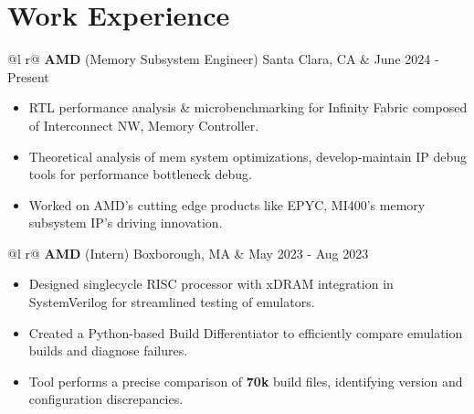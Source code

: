 \documentclass[a4paper,10pt]{article}
\begin{document}
\section{Work Experience}
\begin{tabularx}{\linewidth}{ @{}l r@{} }
    \textbf{AMD} (Memory Subsystem Engineer) Santa Clara, CA & \hfill {\small June 2024 - Present} \\[2.75pt]
    {
        \begin{minipage}[t]{\linewidth}
            \begin{itemize}[nosep,after=\strut, leftmargin=2em, itemsep=3pt]
                \item RTL performance analysis \& microbenchmarking for Infinity Fabric composed of Interconnect NW, Memory Controller.
                \item Theoretical analysis of mem system optimizations, develop-maintain IP debug tools for performance bottleneck debug.
                \item Worked on AMD's cutting edge products like EPYC, MI400's memory subsystem IP's driving innovation.
            \end{itemize}
        \end{minipage}
    }
\end{tabularx}
\vspace{0.1cm}

\begin{tabularx}{\linewidth}{ @{}l r@{} }
    \textbf{AMD} (Intern) Boxborough, MA & \hfill {\small May 2023 - Aug 2023} \\[2.75pt]
    {
        \begin{minipage}[t]{\linewidth}
            \begin{itemize}[nosep,after=\strut, leftmargin=2em, itemsep=3pt]
                \item Designed singlecycle RISC processor with xDRAM integration in SystemVerilog for streamlined testing of emulators.
                \item Created a Python-based Build Differentiator to efficiently compare emulation builds and diagnose failures.
                \item Tool performs a precise comparison of \textbf{70k} build files, identifying version and configuration discrepancies.
            \end{itemize}
        \end{minipage}
    }
\end{tabularx}
\vspace{0.1cm}
\end{document}
